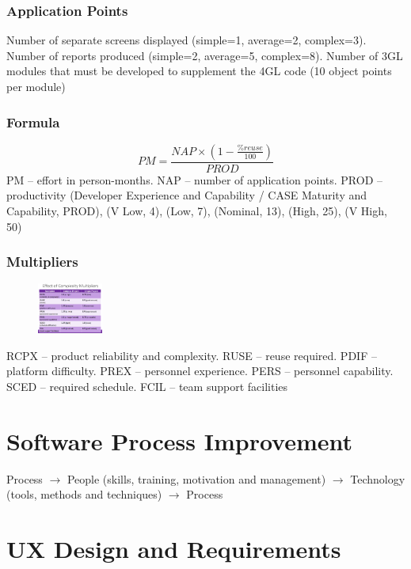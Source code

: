 \documentclass[10pt,a4paper]{article}
\begin{document}
\begin{landscape}
\begin{multicols}{3}
\subsubsection{Application Points}
Number of separate screens displayed (simple=1, average=2, complex=3). Number of reports produced (simple=2, average=5, complex=8). Number of 3GL modules that must be developed to supplement the 4GL code (10 object points per module)
\subsubsection{Formula}
\begin{equation*}
    PM= \frac{NAP\times\left(1 - \frac{\%reuse}{100}\right)}{PROD}
\end{equation*}
PM -- effort in person-months. NAP -- number of application points. PROD -- productivity
(Developer Experience and Capability / CASE Maturity and Capability, PROD), (V Low, 4), (Low, 7), (Nominal, 13), (High, 25), (V High, 50)
\subsubsection{Multipliers}
\begin{figure}
    \includegraphics[width=0.19\textwidth]{Effect}
\end{figure}
RCPX -- product reliability and complexity. RUSE -- reuse required. PDIF -- platform difficulty. PREX -- personnel experience. PERS -- personnel capability. SCED -- required schedule. FCIL -- team support facilities
\vspace{2em}

\section{Software Process Improvement}
Process $\rightarrow$ People (skills, training, motivation and management) $\rightarrow$ Technology (tools, methods and techniques) $\rightarrow$ Process

\section{UX Design and Requirements}

\end{multicols}
\end{landscape}
\end{document}
